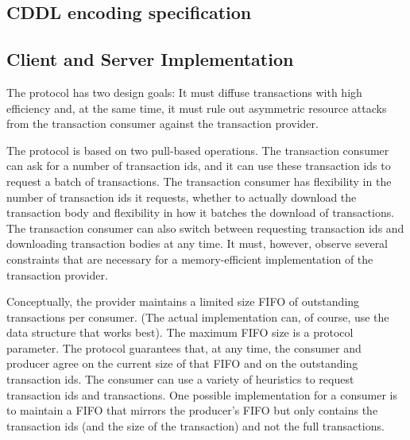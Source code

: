 \subsection{CDDL encoding specification}
\label{object-diffusion-cddl}




\subsection{Client and Server Implementation}

The protocol has two design goals: It must diffuse transactions with high efficiency
and, at the same time, it must rule out
asymmetric resource attacks from the transaction consumer against the transaction provider.

The protocol is based on two pull-based operations.
The transaction consumer can ask for a number of transaction ids, and it can use these
transaction ids to request a batch of transactions.
The transaction consumer has flexibility in the number of transaction ids it requests,
whether to actually download the transaction body
and flexibility in how it batches the download of transactions.
The transaction consumer can also switch between requesting transaction ids and downloading
transaction bodies at any time.
It must, however, observe several constraints that are necessary for a memory-efficient implementation
of the transaction provider.

Conceptually, the provider maintains a limited size FIFO of outstanding transactions per consumer.
(The actual implementation can, of course, use the data structure that works best).
The maximum FIFO size is a protocol parameter.
The protocol guarantees that, at any time, the consumer and producer agree on the current size of
that FIFO and on the outstanding transaction ids.
The consumer can use a variety of heuristics to request transaction ids and transactions.
One possible implementation for a consumer is to maintain a FIFO that mirrors the producer's FIFO
but only contains the transaction ids (and the size of the transaction) and not the full transactions.

